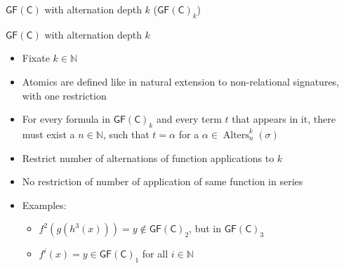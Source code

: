 \documentclass[aspectratio=169]{beamer}
\newcommand{\GFC}{\mathsf{GF}(\mathsf{C})}
\begin{document}
	
	\begin{frame}{$\GFC$ with alternation depth $k$ ($\GFC_k$)}
		\begin{block}{$\GFC$ with alternation depth $k$}
			\begin{itemize}
				\item Fixate $k\in\mathbb N$
				\item Atomics are defined like in natural extension to non-relational signatures, with one restriction
				\item For every formula in $\GFC_k$ and every term $t$ that appears in it, there must exist a $n\in\mathbb N$, such that $t=\alpha$ for a $\alpha\in\operatorname{Alters}^k_n(\sigma)$
			\end{itemize}
		\end{block}
		\begin{itemize}
			\item Restrict number of alternations of function applications to $k$
			\item No restriction of number of application of same function in series
			\item Examples:
			\begin{itemize}
				\item $f^2(g(h^3(x)))=y\notin \GFC_2$, but in $\GFC_3$
				\item $f^i(x)=y\in \GFC_1$ for all $i\in \mathbb N$
			\end{itemize}
		\end{itemize}
	\end{frame}
	
	\iffalse
	\begin{frame}{Characterising RCR$_k$ Logically i}
		Hinges on three lemmas:
		\begin{enumerate}
			\item Formula $f^m(x)=y\in \GFC_1$ can be translated to formula in $\GFC_1$ that is equivalent for ~structures with $n$ elements and only $f^i$ with $i\leq n$ appears
			\item Formula $g^m(s(x))=y\in \GFC_d$ can be translated to formula in $\GFC_d$ that is equivalent for structure with $n$ elements and only $f^i$ with $i\leq n$ appears
			\item Formula $R(t_1(x_1),\dots,t_\ell(x_\ell))\in \GFC_d$ can be translated to formula in $\GFC_d$ that is equivalent for structure with $n$ elements and only $f^i$ with $i\leq n$ appears
		\end{enumerate}
	\end{frame}
	\fi
	
\end{document}
